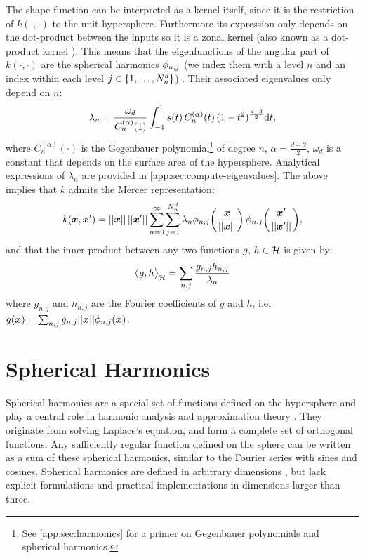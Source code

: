 The shape function can be interpreted as a kernel itself, since it is the restriction of $k(\cdot, \cdot)$ to the unit hypersphere. Furthermore its expression only depends on the dot-product between the inputs so it is a zonal kernel (also known as a dot-product kernel \citep{bietti2020deep}). This means that the eigenfunctions of the angular part of $k(\cdot, \cdot)$ are the spherical harmonics $\phi_{n, j}$ (we index them with a level $n$ and an index within each level $j \in \{1, \dots, N^d_n\}$) \citep{wendland2005,Dutordoir2020spherical}. Their associated eigenvalues only depend on $n$:
\begin{equation}
\label{eq:compute-fourier-coefficients}
    \lambda_{n} = 
   \frac{\omega_{d}}{C_n^{(\alpha)}(1)} \int_{-1}^1 s(t)\,C_n^{(\alpha)}(t)\,(1 - t^2)^{\frac{d-3}{2}} \mathrm{d}{t},
\end{equation}
where $C_n^{(\alpha)}(\cdot)$ is the Gegenbauer polynomial\footnote{See \cref{app:sec:harmonics} for a primer on Gegenbauer polynomials and spherical harmonics.} of degree $n$, $\alpha = \frac{d-2}{2}$, $\omega_d$ is a constant that depends on the surface area of the hypersphere. Analytical expressions of $\lambda_n$ are provided in \cref{app:sec:compute-eigenvalues}.
The above implies that $k$ admits the Mercer representation:
\begin{equation}
    \label{eq:mercer}
    k(\vx, \vx') = \norm{\vx}\, \norm{\vx'} \sum_{n=0}^\infty \sum_{j=1}^{\dnumharmonicsforlevel}  \lambda_n \sh_{n, j}\left(\frac{\vx}{\norm{\vx}}\right)\, \sh_{n, j}\left(\frac{\vx'}{\norm{\vx'}}\right),
\end{equation}
and that the inner product between any two functions $g,\, h \in {\mathcal{H}}$ is given by:
\begin{equation}
\label{eq:RKHSinnerproduct}
\big\langle g, h \big\rangle_{{\mathcal{H}}} = 
    \sum_{n,j}
            \frac{{g}_{n, j} {h}_{n, j}}{\lambda_{n}}
\end{equation}
where $g_{n, j}$ and $h_{n, j}$ are the Fourier coefficients of $g$ and $h$, i.e. $g(\bm{x}) = \sum_{n,j} g_{n,j} \lvert\lvert \bm{x}\rvert\rvert \phi_{n,j}(\bm{x})$.


\section{Spherical Harmonics}

Spherical harmonics are a special set of functions defined on the hypersphere and play a central role in harmonic analysis and approximation theory \citep{wendland2005}. They originate from solving Laplace's equation, and form a complete set of orthogonal functions. Any sufficiently regular function defined on the sphere can be written as a sum of these spherical harmonics, similar to the Fourier series with sines and cosines. Spherical harmonics are defined in arbitrary dimensions \citep{frye2014,dai2013}, but lack explicit formulations and practical implementations in dimensions larger than three. %

